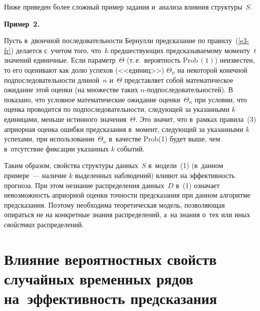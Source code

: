 \begin{multicols}{2}
  Ниже приведен более сложный пример задания и~анализа влияния 
структуры~$S$. 

\smallskip

\noindent
  \textbf{Пример~2.}
  
  Пусть в~двоичной последовательности Бернулли предсказание по 
правилу~(\ref{e3-fr}) делается с~учетом того, что~$k$ предшествующих 
предсказываемому моменту~$t$ значений единичные. Если 
параметр~$\Theta$ (т.\,е.\ вероятность $\mathrm{Prob}\,(1)$) неизвестен, то 
его оценивают как долю успехов (<<единиц>>) $\Theta_n$ на некоторой 
конечной подпоследовательности длиной~$n$ и~$\Theta$ представляет 
собой математическое ожидание этой оценки (на множестве таких  
$n$-под\-по\-сле\-до\-ва\-тель\-но\-стей). В~\cite{12-fr} показано, что 
условное математические ожидание оценки~$\Theta_n$ при условии, что 
оценка проводится по подпоследовательности, следующей за указанными 
$k$ единицами, меньше истинного значения~$\Theta$. Это значит, что 
в~рамках правила~(3) априорная оценка ошибки предсказания в~момент, 
следующий за указанными $k$ успехами, при использовании~$\Theta_n$ 
в~качестве Prob(1) будет выше, чем в~отсутствие фиксации указанных $k$ 
событий.
  
  Таким образом, свойства структуры данных~$S$ в~модели~(1) (в~данном 
примере~--- наличие $k$ выделенных наблюдений) влияют на 
эффективность прогноза. При этом незнание распределения данных~$D$ 
в~(1) означает невозможность априорной оценки точности предсказания при 
данном алгоритме предсказания. Поэтому необходима теоретическая 
модель, позволяющая опираться не на конкретные знания распределений, 
а~на знания о~тех или иных \textit{свойствах} распределений. 
  

\section{Влияние вероятностных свойств случайных временных 
рядов на~эффективность предсказания}



\end{multicols}
